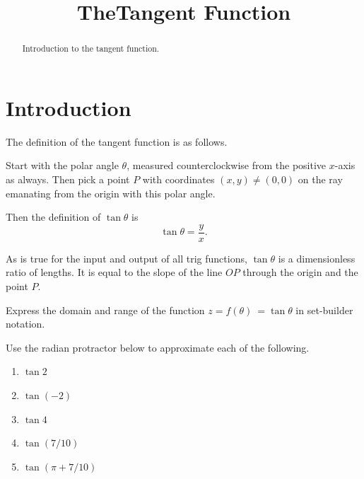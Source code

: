 \documentclass{ximera}
\title{TheTangent Function}
\begin{document}
\begin{abstract}
Introduction to the tangent function.
\end{abstract}
\maketitle



\section{Introduction}

The definition of the tangent function is as follows. 

Start with the polar angle $\theta$, measured counterclockwise from the positive $x$-axis as always. Then pick a point $P$ with coordinates $(x,y) \neq (0,0)$ on the ray emanating from the origin with this polar angle.

Then the definition of $\tan\theta$ is
\[
   \tan \theta = \frac{y}{x}.
\]

As is true for the input and output of all trig functions, $\tan\theta$ is a dimensionless ratio of lengths. It is equal to the slope of the line $OP$ through the origin and the point $P$.

\begin{question} \label{QzaMsaw}
Express the domain and range of the function $z=f(\theta) \ =\tan\theta$ in set-builder notation.
\end{question}


\begin{question} \label{Q45dsfTRFGree}
Use the radian protractor below to approximate each of the following.
\begin{enumerate}
\item $\tan 2$

\item $\tan(-2)$

\item $\tan 4$

\item $\tan(7/10)$

\item $\tan(\pi + 7/10)$
\end{enumerate}


\begin{onlineOnly}
    \begin{center}
\end{center}
\end{onlineOnly}
\end{question}
\end{document}
